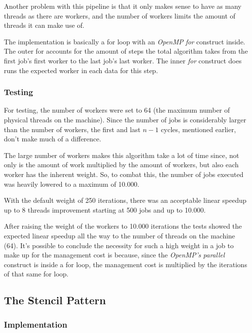 \documentclass[10pt,journal]{IEEEtran}
\begin{document}
Another problem with this pipeline is that it only makes sense to have as many threads as there are workers, and the number of workers limits the amount of threads it can make use of.

The implementation is basically a for loop with an \textit{OpenMP} \textit{for} construct inside. The outer for accounts for the amount of steps the total algorithm takes from the first job's first worker to the last job's last worker. The inner \textit{for} construct does runs the expected worker in each data for this step.

\subsubsection{Testing}

For testing, the number of workers were set to 64 (the maximum number of physical threads on the machine). Since the number of jobs is considerably larger than the number of workers, the first and last $ n - 1 $ cycles, mentioned earlier, don't make much of a difference.

The large number of workers makes this algorithm take a lot of time since, not only is the amount of work multiplied by the amount of workers, but also each worker has the inherent weight. So, to combat this, the number of jobs executed was heavily lowered to a maximum of 10.000.

With the default weight of 250 iterations, there was an acceptable linear speedup up to 8 threads improvement starting at 500 jobs and up to 10.000.

After raising the weight of the workers to 10.000 iterations the tests showed the expected linear speedup all the way to the number of threads on the machine (64). It's possible to conclude the necessity for such a high weight in a job to make up for the management cost is because, since the \textit{OpenMP's} \textit{parallel} construct is inside a for loop, the management cost is multiplied by the iterations of that same for loop.

\subsection{The Stencil Pattern}

\subsubsection{Implementation}
\end{document}
